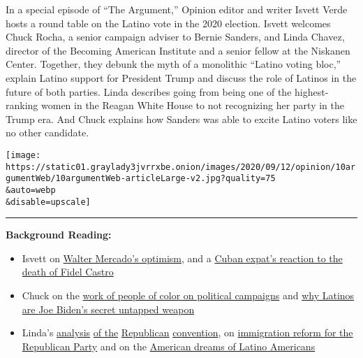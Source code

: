 In a special episode of ``The Argument,'' Opinion editor and writer
Isvett Verde hosts a round table on the Latino vote in the 2020
election. Isvett welcomes Chuck Rocha, a senior campaign adviser to
Bernie Sanders, and Linda Chavez, director of the Becoming American
Institute and a senior fellow at the Niskanen Center. Together, they
debunk the myth of a monolithic ``Latino voting bloc,'' explain Latino
support for President Trump and discuss the role of Latinos in the
future of both parties. Linda describes going from being one of the
highest-ranking women in the Reagan White House to not recognizing her
party in the Trump era. And Chuck explains how Sanders was able to
excite Latino voters like no other candidate.

\texttt{[image: https://static01.graylady3jvrrxbe.onion/images/2020/09/12/opinion/10argumentWeb/10argumentWeb-articleLarge-v2.jpg?quality=75\\\&auto=webp\\\&disable=upscale]}

\begin{center}\rule{0.5\linewidth}{\linethickness}\end{center}

\textbf{Background Reading:}

\begin{itemize}
\item
  Isvett on
  \href{https://www.nytimes3xbfgragh.onion/2019/11/05/opinion/walter-mercado.html}{Walter
  Mercado's optimism}, and a
  \href{https://www.nytimes3xbfgragh.onion/2016/11/28/opinion/what-castros-death-means-for-a-child-of-mariel.html}{Cuban
  expat's reaction to the death of Fidel Castro}
\item
  Chuck on the
  \href{https://www.nytimes3xbfgragh.onion/2020/06/24/opinion/2020-campaigns-diversity.html}{work
  of people of color on political campaigns} and
  \href{https://www.nytimes3xbfgragh.onion/2020/08/18/opinion/joe-biden-kamala-harris-latino-vote.html?searchResultPosition=1}{why
  Latinos are Joe Biden's secret untapped weapon}
\item
  Linda's
  \href{https://www.nytimes3xbfgragh.onion/2020/08/25/opinion/rnc-best-worst-night-1.html?searchResultPosition=4}{analysis}
  \href{https://www.nytimes3xbfgragh.onion/2020/08/26/opinion/rnc-best-worst-night-2.html?searchResultPosition=3}{of
  the}
  \href{https://www.nytimes3xbfgragh.onion/2020/08/27/opinion/rnc-best-worst-night-3.html?searchResultPosition=2}{Republican}
  \href{https://www.nytimes3xbfgragh.onion/2020/08/28/opinion/rnc-best-worst-trump-night-4.html?searchResultPosition=1}{convention},
  on
  \href{https://www.nytimes3xbfgragh.onion/2005/11/17/opinion/fellow-republicans-open-your-doors.html}{immigration
  reform for the Republican Party} and on the
  \href{https://www.nytimes3xbfgragh.onion/2006/03/30/opinion/30iht-edchavez.html?searchResultPosition=260}{American
  dreams of Latino Americans}
\end{itemize}

